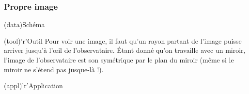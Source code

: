 \documentclass[../../main/main.tex]{subfiles}
\begin{document}
\subsubsection{Propre image}
\begin{tcbraster}[raster columns=2, raster equal height=rows]
	\begin{tcn}(data){Schéma}
		\begin{center}
		\end{center}
	\end{tcn}
	\begin{tcolorbox}[blankest, raster multicolumn=1, space to=\myspace]
		\begin{tcbraster}[raster columns=1]
			\begin{tcn}(tool)'r'{Outil}
				Pour voir une image, il faut qu'un rayon partant de l'image
				puisse arriver jusqu'à l'œil de l'observataire. Étant donné
				qu'on travaille avec un miroir, l'image de l'observataire est
				son symétrique par le plan du miroir (même si le miroir ne
				s'étend pas jusque-là !).
			\end{tcn}
			\begin{tcn}(appl)'r'{Application}
			\end{tcn}
		\end{tcbraster}
	\end{tcolorbox}
\end{tcbraster}
\end{document}
